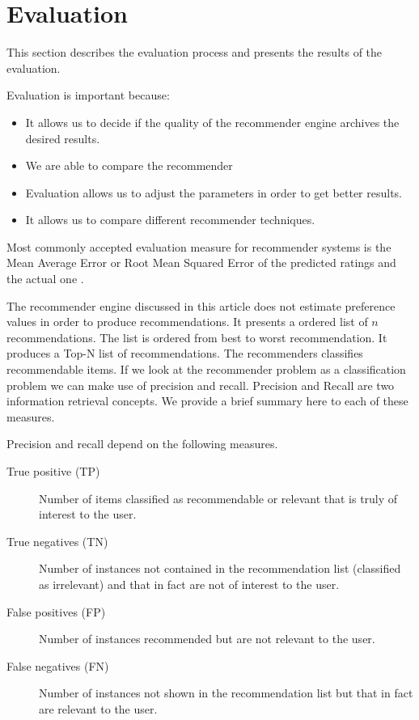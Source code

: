 \section{Evaluation}
\label{sec:evaluation}

This section describes the evaluation process and presents the results of the evaluation.

Evaluation is important because:
\begin{itemize}
  \item It allows us to decide if the quality of the recommender engine archives the desired results. 
  \item We are able to compare the recommender
  \item Evaluation allows us to adjust the parameters in order to get better results.
  \item It allows us to compare different recommender techniques.
\end{itemize}


Most commonly accepted evaluation measure for recommender systems is the Mean Average Error or Root Mean Squared Error of the predicted ratings and the actual one \cite{Ricci}.

The recommender engine discussed in this article does not estimate preference values in order to produce recommendations. It presents a ordered list of $n$ recommendations.   The list is ordered from best to worst recommendation. It produces a Top-N list of recommendations. The recommenders classifies recommendable items. If we look at the recommender problem as a classification problem we can make use of precision and recall. Precision and Recall are two information retrieval concepts. We provide a brief summary here to each of these measures.

Precision and recall depend on the following measures.
\begin{description}
\item[True positive (TP)] Number of items classified as recommendable or relevant that is truly of interest to the user.
\item[True negatives (TN)] Number of instances not contained in the recommendation list (classified as irrelevant) and that in fact are not of interest to the user.
\item[False positives (FP)] Number of instances recommended but are not relevant to the user.
\item[False negatives (FN)] Number of instances not shown in the recommendation list but that in fact are relevant to the user.
\end{description}


